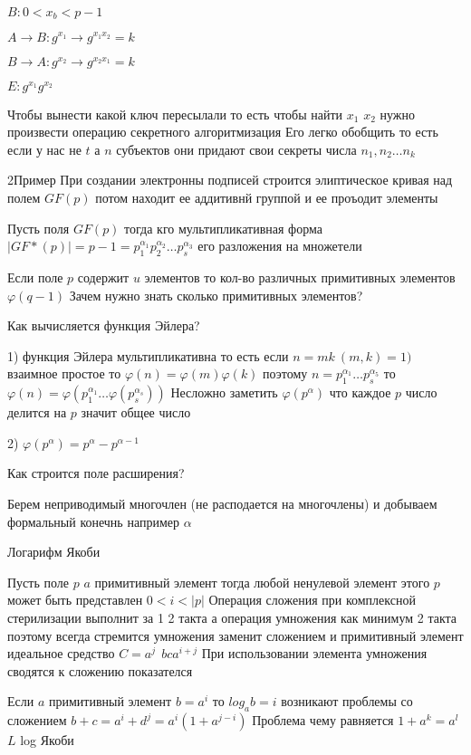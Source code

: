 $B: 0 < x_b < p-1$

$A \to B: g^{x_1} \to g^{x_1 x_2} = k$

$B \to A: g^{x_2} \to g^{x_2 x_1} = k$

$E:g^{x_1}g^{x_2}$

Чтобы вынести какой ключ пересылали то есть чтобы найти $x_1$ $x_2$ нужно
произвести операцию секретного алгоритмизация Его легко обобщить то есть
если у нас не $t$ а $n$ субъектов они придают свои секреты числа
$n_1, n_2 \ldots n_k$


2Пример При создании электронны подписей строится элиптическое кривая над полем
$GF(p)$ потом находит ее аддитивнй группой и ее проъодит элементы

Пусть поля $GF(p)$ тогда кго мультипликативная форма $|GF*(p)| = p-1 =
p_1^{\alpha_1}p_2^{\alpha_2} \ldots p_s^{\alpha_3}$ его разложения на
множетели

\begin{theorem}
  Если поле $p$ содержит $u$ элементов то кол-во различных примитивных
  элементов $\varphi(q-1)$ Зачем нужно знать сколько примитивных элементов?
\end{theorem}

Как вычисляется функция Эйлера?

1) функция Эйлера мультипликативна то есть если $n=mk ~ (m,k) = 1)$
взаимное простое то $\varphi(n) = \varphi(m) \varphi(k)$ поэтому
$n = p_1^{\alpha_1} \ldots p_s^{\alpha_5}$ то $\varphi(n) = \varphi(p_1^{
\alpha_1} \ldots \varphi(p_s^{\alpha_s}))$ Несложно заметить
$\varphi(p^{\alpha})$ что каждое $p$ число делится на $p$ значит общее число

2) $\varphi(p^{\alpha}) = p^{\alpha} - p^{\alpha-1}$

Как строится поле расширения?

Берем неприводимый многочлен (не расподается на многочлены) и добываем
формальный конечнь например $\alpha$

Логарифм Якоби

Пусть поле $p$ $a$ примитивный элемент тогда любой ненулевой элемент этого $p$
может быть представлен $0 < i < |p|$ Операция сложения при комплексной
стерилизации выполнит за 1 2 такта а операция умножения как минимум 2 такта поэтому всегда стремится умножения заменит сложением и примитивный элемент
идеальное средство $C = a^j ~~ bc a^{i+j}$ При использовании элемента
умножения сводятся к сложению показателся

Если $a$ примитивный элемент $b = a^i$ то $log_a b = i$ возникают проблемы со
сложением $b + c = a^i + d^j = a^i(1+ a^{j-i})$ Проблема чему равняется
$1+a^k = a^l$ $L$ log Якоби


